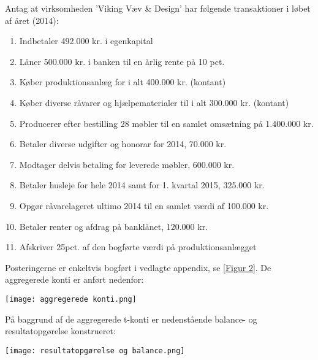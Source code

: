 \documentclass[10pt,reqno, usenames]{article}
\begin{document}
\begin{tcolorbox}[colback=red!5!white, colframe=red!50!black, title=Eksempel på bogføring af en række transaktioner]
Antag at virksomheden 'Viking Væv \& Design' har følgende transaktioner i løbet af året (2014): 

\begin{enumerate}
   \item Indbetaler 492.000 kr. i egenkapital
\item Låner 500.000 kr. i banken til en årlig rente på 10 pct.
\item Køber produktionsanlæg for i alt 400.000 kr. (kontant)
\item Køber diverse råvarer og hjælpematerialer til i alt 300.000 kr. (kontant)
\item  Producerer efter bestilling 28 møbler til en samlet omsætning på 1.400.000 kr.
\item Betaler diverse udgifter og honorar for 2014, 70.000 kr.
\item Modtager delvis betaling for leverede møbler, 600.000 kr.
\item Betaler husleje for hele 2014 samt for 1. kvartal 2015, 325.000 kr.
\item Opgør råvarelageret ultimo 2014 til en samlet værdi af 100.000 kr.
\item Betaler renter og afdrag på banklånet, 120.000 kr.
\item Afskriver 25pct. af den bogførte værdi på produktionsanlægget
\end{enumerate}

Posteringerne er enkeltvis bogført i vedlagte appendix, se \ref{Figur 2}. De aggregerede konti er anført nedenfor: 

\centering  
\vspace{10pt}
    \texttt{[image: aggregerede konti.png]}
\vspace{10pt}

På baggrund af de aggregerede t-konti er nedenstående balance- og resultatopgørelse konstrueret: 

\centering  
\vspace{10pt}
    \texttt{[image: resultatopgørelse og balance.png]}
\vspace{10pt}

\end{tcolorbox}
\end{document}
